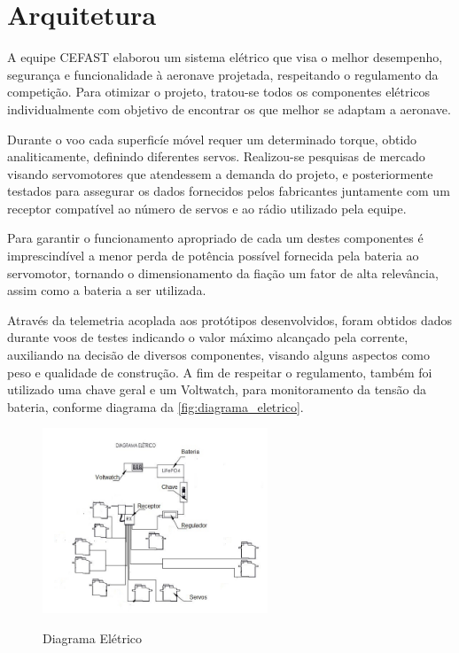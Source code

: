 \chapter{Arquitetura}\label{arq.cap}

A equipe CEFAST elaborou um sistema elétrico que visa o melhor desempenho,
segurança e funcionalidade à aeronave projetada, respeitando o regulamento da competição.
Para otimizar o projeto, tratou-se todos os componentes elétricos individualmente com objetivo
de encontrar os que melhor se adaptam a aeronave.

Durante o voo cada superficíe móvel requer um determinado torque, obtido
analiticamente, definindo diferentes servos. Realizou-se pesquisas de mercado visando
servomotores que atendessem a demanda do projeto, e posteriormente testados para assegurar
os dados fornecidos pelos fabricantes juntamente com um receptor compatível ao número de
servos e ao rádio utilizado pela equipe.

Para garantir o funcionamento apropriado de cada um destes componentes é
imprescindível a menor perda de potência possível fornecida pela bateria ao servomotor,
tornando o dimensionamento da fiação um fator de alta relevância, assim como a bateria a ser
utilizada.

Através da telemetria acoplada aos protótipos desenvolvidos, foram obtidos dados
durante voos de testes indicando o valor máximo alcançado pela corrente, auxiliando na decisão
de diversos componentes, visando alguns aspectos como peso e qualidade de construção.
A fim de respeitar o regulamento, também foi utilizado uma chave geral e um Voltwatch,
para monitoramento da tensão da bateria, conforme diagrama da \autoref{fig:diagrama_eletrico}.

\begin{figure}[h]
    \centering
    \caption{Diagrama Elétrico}
    \includegraphics[width=0.6\textwidth]{./Imagens/Diagrama_eletrico}
    \label{fig:diagrama_eletrico}
\end{figure}

